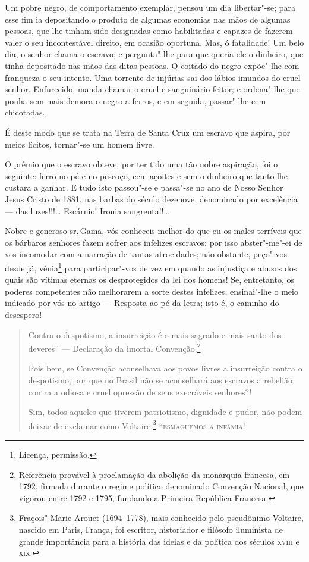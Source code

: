 Um pobre negro, de comportamento exemplar, pensou um dia libertar"-se;
para esse fim ia depositando o produto de algumas economias nas mãos de
algumas pessoas, que lhe tinham sido designadas como habilitadas e
capazes de fazerem valer o seu incontestável direito, em ocasião
oportuna. Mas, ó fatalidade! Um belo dia, o senhor chama o escravo; e
pergunta"-lhe para que queria ele o dinheiro, que tinha depositado nas
mãos das ditas pessoas. O coitado do negro expõe"-lhe com franqueza o seu
intento. Uma torrente de injúrias sai dos lábios imundos do cruel
senhor. Enfurecido, manda chamar o cruel e sanguinário feitor; e
ordena"-lhe que ponha sem mais demora o negro a ferros, e em seguida,
passar"-lhe cem chicotadas.

É deste modo que se trata na Terra de Santa Cruz um escravo que aspira,
por meios lícitos, tornar"-se um homem livre.

O prêmio que o escravo obteve, por ter tido uma tão nobre aspiração, foi
o seguinte: ferro no pé e no pescoço, cem açoites e sem o dinheiro que
tanto lhe custara a ganhar. E tudo isto passou"-se e passa"-se no ano de
Nosso Senhor Jesus Cristo de 1881, nas barbas do século dezenove,
denominado por excelência --- das luzes!!!\ldots{} Escárnio! Ironia
sangrenta!!\ldots{}

Nobre e generoso sr.\,Gama, vós conheceis melhor do que eu os males
terríveis que os bárbaros senhores fazem sofrer aos infelizes escravos:
por isso abster"-me"-ei de vos incomodar com a narração de tantas
atrocidades; não obstante, peço"-vos desde já, vênia\footnote{Licença,
  permissão.} para participar"-vos de vez em quando as injustiça e abusos
dos quais são vítimas eternas os desprotegidos da lei dos homens! Se,
entretanto, os poderes competentes não melhorarem a sorte destes
infelizes, ensinai"-lhe o meio indicado por vós no artigo --- Resposta
ao pé da letra; isto é, o caminho do desespero!

\begin{quote}
Contra o despotismo, a insurreição é o mais sagrado e mais santo dos
deveres'' --- Declaração da imortal Convenção.\footnote{Referência
  provável à proclamação da abolição da monarquia francesa, em 1792,
  firmada durante o regime político denominado Convenção Nacional, que
  vigorou entre 1792 e 1795, fundando a Primeira República Francesa.}

Pois bem, se Convenção aconselhava aos povos livres a insurreição contra
o despotismo, por que no Brasil não se aconselhará aos escravos a
rebelião contra a odiosa e cruel opressão de seus execráveis senhores?!

Sim, todos aqueles que tiverem patriotismo, dignidade e pudor, não podem
deixar de exclamar como Voltaire:\footnote{Fraçois"-Marie Arouet
  (1694--1778), mais conhecido pelo pseudônimo Voltaire, nascido em
  Paris, França, foi escritor, historiador e filósofo iluminista de
  grande importância para a história das ideias e da política dos
  séculos \textsc{xviii} e \textsc{xix}.}
``\textsc{esmaguemos a infâmia}!
\end{quote}

